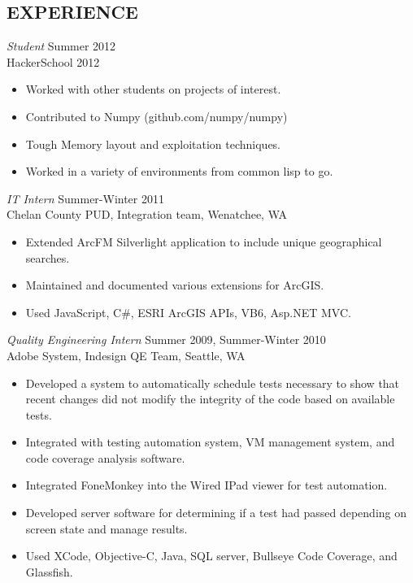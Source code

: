 \documentclass[line]{res}
\begin{document}
\begin{resume}
\section{EXPERIENCE} 
 								 
                {\sl Student} \hfill             Summer 2012 \\
                HackerSchool 2012
                 \begin{itemize}  \itemsep -2pt %
	                 \item Worked with other students on projects of interest.
	                 \item Contributed to Numpy (github.com/numpy/numpy)
	                 \item Tough Memory layout and exploitation techniques.
	                 \item Worked in a variety of environments from common lisp to go.
                 \end{itemize} 				

 				{\sl IT Intern} \hfill Summer-Winter 2011\\
				Chelan County PUD, Integration team, Wenatchee, WA
                 \begin{itemize}  \itemsep -2pt %
					 \item Extended	ArcFM Silverlight application to include unique geographical searches.
					 \item Maintained and documented various extensions for ArcGIS.
					 \item Used JavaScript, C\#, ESRI ArcGIS APIs, VB6, Asp.NET MVC.
				 \end{itemize}
				 
				{\sl Quality Engineering Intern} \hfill Summer 2009, Summer-Winter 2010 \\
                Adobe System, Indesign QE Team, Seattle, WA
                 \begin{itemize}  \itemsep -2pt %
	                 \item Developed a system to automatically schedule tests necessary to show that recent changes did not modify the integrity of the code based on available tests.
	                \item Integrated with testing automation system, VM management system, and code coverage analysis software.
	                 \item Integrated FoneMonkey into the Wired IPad viewer for test automation.
	                 \item Developed server software for determining if a test had passed depending on screen state and manage results.
	                 \item Used XCode, Objective-C, Java, SQL server, Bullseye Code Coverage, and Glassfish.
 				 \end{itemize}
                 				

\end{resume}
\end{document}
